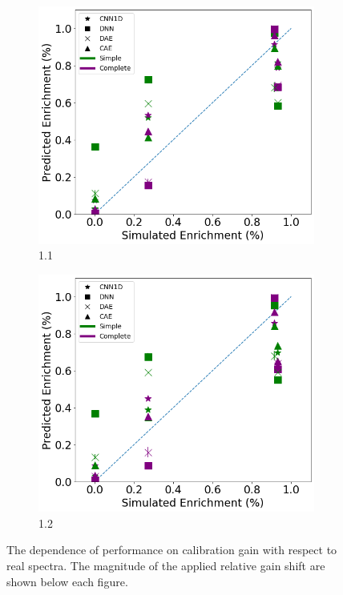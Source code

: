 \begin{figure}[H]
     \begin{subfigure}[b]{0.49\textwidth}
         \centering
         \includegraphics[width=\textwidth]{images/measured_uranium_11.png}
         \caption{1.1}
         \label{fig:measured_uranium_11}
     \end{subfigure}
     \hfill
     \begin{subfigure}[b]{0.49\textwidth}
         \centering
         \includegraphics[width=\textwidth]{images/measured_uranium_12.png}
         \caption{1.2}
         \label{fig:measured_uranium_12}
     \end{subfigure}
        \caption{The dependence of performance on calibration gain with respect to real spectra. The magnitude of the applied relative gain shift are shown below each figure.}
        \label{fig:realuranium-cal}
\end{figure}



